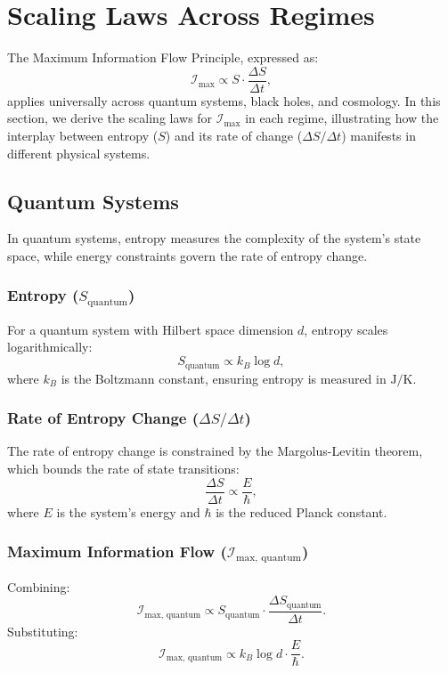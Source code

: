 \documentclass[12pt]{article}
\begin{document}
\section{Scaling Laws Across Regimes}
\label{sec:scaling_laws}

The Maximum Information Flow Principle, expressed as:
\[
\mathcal{I}_{\text{max}} \propto S \cdot \frac{\Delta S}{\Delta t},
\]
applies universally across quantum systems, black holes, and cosmology. In this section, we derive the scaling laws for \( \mathcal{I}_{\text{max}} \) in each regime, illustrating how the interplay between entropy (\( S \)) and its rate of change (\( \Delta S / \Delta t \)) manifests in different physical systems.

\subsection{Quantum Systems}
In quantum systems, entropy measures the complexity of the system’s state space, while energy constraints govern the rate of entropy change.

\subsubsection{Entropy (\( S_{\text{quantum}} \))}
For a quantum system with Hilbert space dimension \( d \), entropy scales logarithmically:
\[
S_{\text{quantum}} \propto k_B \log d,
\]
where \( k_B \) is the Boltzmann constant, ensuring entropy is measured in \( \text{J/K} \).

\subsubsection{Rate of Entropy Change (\( \Delta S / \Delta t \))}
The rate of entropy change is constrained by the Margolus-Levitin theorem, which bounds the rate of state transitions:
\[
\frac{\Delta S}{\Delta t} \propto \frac{E}{\hbar},
\]
where \( E \) is the system’s energy and \( \hbar \) is the reduced Planck constant.

\subsubsection{Maximum Information Flow (\( \mathcal{I}_{\text{max, quantum}} \))}
Combining:
\[
\mathcal{I}_{\text{max, quantum}} \propto S_{\text{quantum}} \cdot \frac{\Delta S_{\text{quantum}}}{\Delta t}.
\]
Substituting:
\[
\mathcal{I}_{\text{max, quantum}} \propto k_B \log d \cdot \frac{E}{\hbar}.
\]
\end{document}
